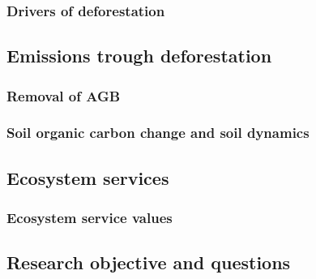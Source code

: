\subsubsection{Drivers of deforestation}
\subsection{Emissions trough deforestation}
\subsubsection{Removal of AGB}
\subsubsection{Soil organic carbon change and soil dynamics}
\subsection{Ecosystem services}
\subsubsection{Ecosystem service values}
\subsection{Research objective and questions}

